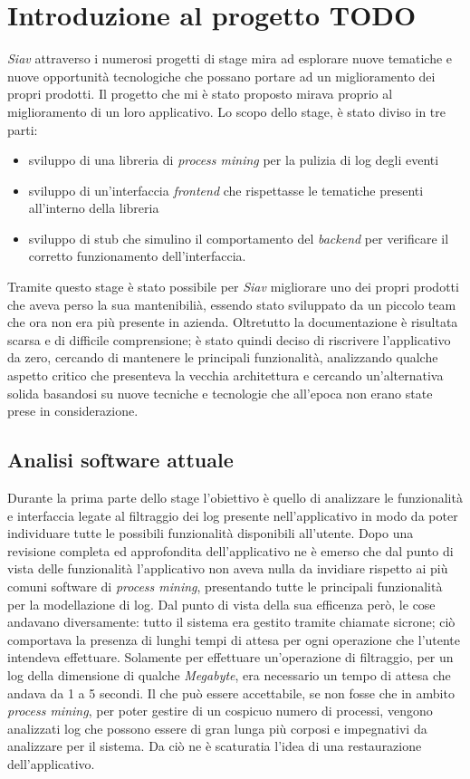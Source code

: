 \section{Introduzione al progetto TODO}
\textit{Siav} attraverso i numerosi progetti di stage mira ad esplorare nuove tematiche e nuove opportunità tecnologiche che possano portare ad un miglioramento dei propri prodotti. Il progetto che mi è stato proposto mirava proprio al miglioramento di un loro applicativo. Lo scopo dello stage, è stato diviso in tre parti:
\begin{itemize}
	\item sviluppo di una libreria di \textit{process mining} per la pulizia di log degli eventi
	\item sviluppo di un'interfaccia \textit{frontend} che rispettasse le tematiche presenti all'interno della libreria
	\item sviluppo di stub che simulino il comportamento del \textit{backend} per verificare il corretto funzionamento dell'interfaccia.
\end{itemize}
Tramite questo stage è stato possibile per \textit{Siav} migliorare uno dei propri prodotti che aveva perso la sua mantenibilià, essendo stato sviluppato da un piccolo team che ora non era più presente in azienda. Oltretutto la documentazione è risultata scarsa e di difficile comprensione; è stato quindi deciso di riscrivere l'applicativo da zero, cercando di mantenere le principali funzionalità, analizzando qualche aspetto critico che presenteva la vecchia architettura e cercando un'alternativa solida basandosi su nuove tecniche e tecnologie che all'epoca non erano state prese in considerazione. 
\subsection{Analisi software attuale}
Durante la prima parte dello stage l'obiettivo è quello di analizzare le funzionalità e interfaccia legate al filtraggio dei log presente nell'applicativo in modo da poter individuare tutte le possibili funzionalità disponibili all'utente. Dopo una revisione completa ed approfondita dell'applicativo ne è emerso che dal punto di vista delle funzionalità l'applicativo non aveva nulla da invidiare rispetto ai più comuni software di \textit{process mining}, presentando tutte le principali funzionalità per la modellazione di log. Dal punto di vista della sua efficenza però, le cose andavano diversamente: tutto il sistema era gestito tramite chiamate sicrone; ciò comportava la presenza di lunghi tempi di attesa per ogni operazione che l'utente intendeva effettuare. Solamente per effettuare un'operazione di filtraggio, per un log della dimensione di qualche \textit{Megabyte}, era necessario un tempo di attesa che andava da 1 a 5 secondi. Il che può essere accettabile, se non fosse che in ambito \textit{process mining}, per poter gestire di un cospicuo numero di processi, vengono analizzati log che possono essere di gran lunga più corposi e impegnativi da analizzare per il sistema. Da ciò ne è scaturatia l'idea di una restaurazione dell'applicativo.

